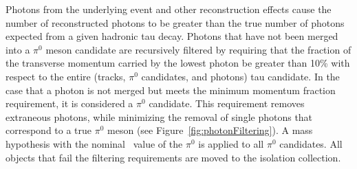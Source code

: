Photons from the underlying event and other reconstruction effects cause the
number of reconstructed photons to be greater than the true number of photons
expected from a given hadronic tau decay.  Photons that have not been merged into
a $\pi^0$ meson candidate are recursively filtered by requiring that the
fraction of the transverse momentum carried by the lowest \pt photon be
greater than 10\% with respect to the entire (tracks, $\pi^0$ candidates, and
photons) tau candidate. In the case that a photon is not merged but meets the
minimum momentum fraction requirement, it is considered a $\pi^0$
candidate.  This requirement removes extraneous photons, while minimizing the
removal of single photons that correspond to a true $\pi^0$ meson
(see Figure~\ref{fig:photonFiltering}). A mass hypothesis with the
nominal~\cite{PDG} value of the $\pi^0$ is applied to all $\pi^0$ candidates.
All objects that fail the filtering requirements are moved to the isolation
collection.

